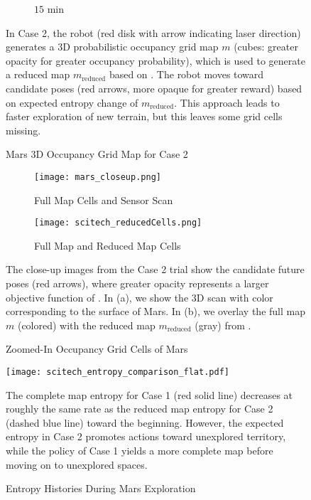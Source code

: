 \begin{figure}[!t]
\begin{subfigure}[t]{0.49\columnwidth}
        		\caption{$15$ min}
		\vspace*{0.025\textwidth}
    	\end{subfigure}
\caption{Mars 3D Occupancy Grid Map for Case 2}
	\medskip
	\small
	In Case 2, the robot (red disk with arrow indicating laser direction) generates a 3D probabilistic occupancy grid map $m$ (cubes: greater opacity for greater occupancy probability), which is used to generate a reduced map $m_\text{reduced}$ based on . The robot moves toward candidate poses (red arrows, more opaque for greater reward) based on expected entropy change of $m_\text{reduced}$. This approach leads to faster exploration of new terrain, but this leaves some grid cells missing.
\label{fig:mars3DogmCase2}
\end{figure}

\begin{figure}[!t]
	\centering
	\begin{subfigure}[t]{0.95\columnwidth}
           	\centering
          	\texttt{[image: mars\_closeup.png]}
        		\caption{Full Map Cells and Sensor Scan}
		\vspace*{0.025\textwidth}
    	\end{subfigure}
	\centering
	\begin{subfigure}[t]{0.95\columnwidth}
           	\centering
          	\texttt{[image: scitech\_reducedCells.png]}
        		\caption{Full Map and Reduced Map Cells}
		\vspace*{0.025\textwidth}
    	\end{subfigure}
	\caption{Zoomed-In Occupancy Grid Cells of Mars}
	\medskip
	\small
	The close-up images from the Case 2 trial show the candidate future poses (red arrows), where greater opacity represents a larger objective function of . In (a), we show the 3D scan with color corresponding to the surface of Mars. In (b), we overlay the full map $m$ (colored) with the reduced map $m_\text{reduced}$ (gray) from .
	\label{fig:marsZoomedIn}
\end{figure}


\begin{figure}
	\centering
	\texttt{[image: scitech\_entropy\_comparison\_flat.pdf]}
	\caption{Entropy Histories During Mars Exploration}
	\medskip
	\small
	The complete map entropy for Case 1 (red solid line) decreases at roughly the same rate as the reduced map entropy for Case 2 (dashed blue line) toward the beginning. However, the expected entropy in Case 2 promotes actions toward unexplored territory, while the policy of Case 1 yields a more complete map before moving on to unexplored spaces.
	\label{fig:mars3Dentropy}
\end{figure}



